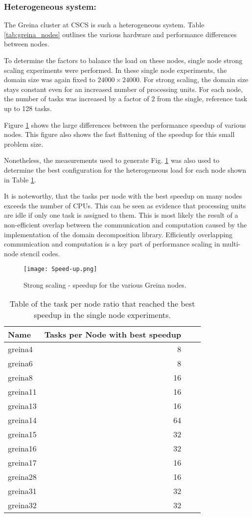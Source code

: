 \subsubsection{Heterogeneous system:}
The Greina cluster at CSCS is such a heterogeneous system.
Table \ref{tab:greina_nodes} outlines the various hardware and performance differences between nodes.

To determine the factors to balance the load on these nodes, single node strong scaling experiments were performed.
In these single node experiments, the domain size was again fixed to $24000 \times 24000$.
For strong scaling, the domain size stays constant even for an increased number of processing units.
For each node, the number of tasks was increased by a factor of 2 from the single, reference task up to 128 tasks.

Figure \ref{fig:singlenode} shows the large differences between the performance speedup of various nodes.
This figure also shows the fast flattening of the speedup for this small problem size.

Nonetheless, the measurements used to generate Fig. \ref{fig:singlenode} was also used to determine the best configuration for the heterogeneous load for each node shown in Table \ref{tab:taskspernode}.

It is noteworthy, that the tasks per node with the best speedup on many nodes exceeds the number of CPUs.
This can be seen as evidence that processing units are idle if only one task is assigned to them.
This is most likely the result of a non-efficient overlap between the communication and computation caused by the implementation of the domain decomposition library.
Efficiently overlapping communication and computation is a key part of performance scaling in multi-node stencil codes.

\begin{figure}[ht]
\texttt{[image: Speed-up.png]}
\caption{Strong scaling - speedup for the various Greina nodes.}
\label{fig:singlenode}
\end{figure}

\begin{table}[!htbp]
\centering
{}
\begin{tabular}{l r r r}
\toprule
Name & Tasks per Node with best speedup \\
\midrule
greina4 & 8 \\
greina6 & 8 \\
greina8 & 16 \\
greina11 & 16 \\
greina13 & 16 \\
greina14 & 64 \\
greina15 & 32 \\
greina16 & 32 \\
greina17 & 16 \\
greina28 & 16 \\
greina31 & 32 \\
greina32 & 32 \\
\bottomrule
\end{tabular}
\caption{Table of the task per node ratio that reached the best speedup in the single node experiments.}
\label{tab:taskspernode}
\end{table}

